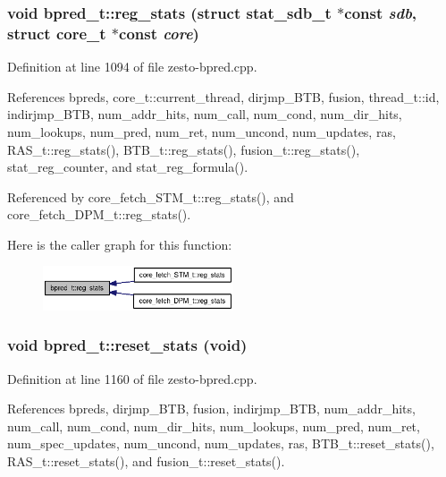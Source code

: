 \subsubsection[{reg\_\-stats}]{\setlength{\rightskip}{0pt plus 5cm}void bpred\_\-t::reg\_\-stats (struct {\bf stat\_\-sdb\_\-t} $\ast$const  {\em sdb}, \/  struct {\bf core\_\-t} $\ast$const  {\em core})}\label{classbpred__t_e3a461a94838883fc3571879d08b4c75}




Definition at line 1094 of file zesto-bpred.cpp.

References bpreds, core\_\-t::current\_\-thread, dirjmp\_\-BTB, fusion, thread\_\-t::id, indirjmp\_\-BTB, num\_\-addr\_\-hits, num\_\-call, num\_\-cond, num\_\-dir\_\-hits, num\_\-lookups, num\_\-pred, num\_\-ret, num\_\-uncond, num\_\-updates, ras, RAS\_\-t::reg\_\-stats(), BTB\_\-t::reg\_\-stats(), fusion\_\-t::reg\_\-stats(), stat\_\-reg\_\-counter, and stat\_\-reg\_\-formula().

Referenced by core\_\-fetch\_\-STM\_\-t::reg\_\-stats(), and core\_\-fetch\_\-DPM\_\-t::reg\_\-stats().

Here is the caller graph for this function:\nopagebreak
\begin{figure}[H]
\begin{center}
\leavevmode
\includegraphics[width=160pt]{classbpred__t_e3a461a94838883fc3571879d08b4c75_icgraph}
\end{center}
\end{figure}
\subsubsection[{reset\_\-stats}]{\setlength{\rightskip}{0pt plus 5cm}void bpred\_\-t::reset\_\-stats (void)}\label{classbpred__t_256cf64d1d35419885b964316cfa95f2}




Definition at line 1160 of file zesto-bpred.cpp.

References bpreds, dirjmp\_\-BTB, fusion, indirjmp\_\-BTB, num\_\-addr\_\-hits, num\_\-call, num\_\-cond, num\_\-dir\_\-hits, num\_\-lookups, num\_\-pred, num\_\-ret, num\_\-spec\_\-updates, num\_\-uncond, num\_\-updates, ras, BTB\_\-t::reset\_\-stats(), RAS\_\-t::reset\_\-stats(), and fusion\_\-t::reset\_\-stats().

